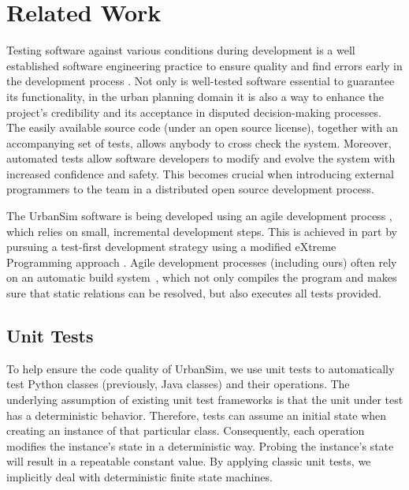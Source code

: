 \documentclass{sig-alternate}
\begin{document}
\section{Related Work}


Testing software against various conditions during development is a well 
established software engineering practice to ensure quality and find errors 
early in the development process \cite{mcgregor:2001,sommerville:2001}.  Not 
only is well-tested software essential to guarantee its functionality, 
in the urban planning domain it is
also a way to enhance the project's credibility and its acceptance in 
disputed decision-making processes. The easily available source code (under an 
open source license), together with an accompanying set of tests, allows 
anybody to cross check the system. Moreover, automated tests allow software 
developers to modify and evolve the system with increased confidence and 
safety. This becomes crucial when introducing external programmers to the team 
in a distributed open source development process. 


The UrbanSim software is being developed using an agile development process
\cite{beck:2000}, which relies on small, incremental development steps.  This
is achieved in part by pursuing a test-first development strategy using a
modified eXtreme Programming approach \cite{beck:2003}.  
Agile development processes (including
ours) often rely on an automatic build system~\cite{fowler:2006}, which not
only compiles the program and makes sure that static relations can be
resolved, but also executes all tests provided.

\newpage

\subsection{Unit Tests}
\label{related-work-unit-tests}

To help ensure the code quality of UrbanSim, we use unit tests 
\cite{beckgamma,hunt:2003,Noonan:2002} to automatically 
test Python classes (previously, Java classes) and their operations.
The underlying assumption of 
existing unit test frameworks is that the unit under test
has a deterministic behavior. Therefore, tests can assume an initial 
state when creating an instance of that particular class. Consequently, each 
operation modifies the instance's state in a deterministic way. Probing the 
instance's state will result in a repeatable constant value. By applying 
classic unit tests, 
we implicitly deal with deterministic finite state machines.
\end{document}

